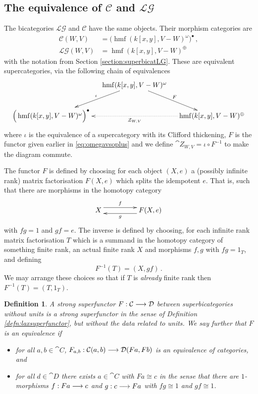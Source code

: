 \documentclass[english,letter paper,12pt,leqno]{article}
\theoremstyle{example}
\newtheorem{definition}[theorem]{Definition}
\numberwithin{equation}{section}
\def\LG{\mathcal{LG}}
\def\be{\begin{equation}}
\def\ee{\end{equation}}
\def\L{\mathcal{C}}
\DeclareMathOperator{\hmf}{hmf}
\begin{document}
\subsection{The equivalence of $\L$ and $\LG$}\label{section:equivalenceforreal}

The bicategories $\LG$ and $\L$ have the same objects. Their morphism categories are 
\begin{align*}
\L(W,V) &= \Big( \hmf( k[x,y], V - W )^{\omega} \Big)^{\bullet}\,,\\
\LG(W,V) &= \hmf( k[x,y], V - W )^{\oplus}
\end{align*}
with the notation from Section \ref{section:superbicatLG}. These are equivalent supercategories, via the following chain of equivalences
\be
\xymatrix@C-1pc{
& \ar[dl]_-{\iota}\hmf( k[x,y], V - W )^{\omega}\ar[dr]^-{F}\\
\Big( \hmf( k[x,y], V - W )^{\omega} \Big)^{\bullet} &  & \hmf( k[x,y], V - W )^{\oplus}\ar@{.>}[ll]^-{\cat{Z}_{W,V}}
}
\ee
where $\iota$ is the equivalence of a supercategory with its Clifford thickening, $F$ is the functor given earlier in \eqref{eq:omegavsoplus} and we define $\cat{Z}_{W,V} = \iota \circ F^{-1}$ to make the diagram commute. 

The functor $F$ is defined by choosing for each object $(X,e)$ a (possibly infinite rank) matrix factorisation $F(X,e)$ which splits the idempotent $e$. That is, such that there are morphisms in the homotopy category
\[
\xymatrix@C+2pc{
X \ar@<1ex>[r]^-{f} & F(X,e) \ar@<1ex>[l]^-{g}
}
\]
with $f g = 1$ and $gf = e$. The inverse is defined by choosing, for each infinite rank matrix factorisation $T$ which is a summand in the homotopy category of something finite rank, an actual finite rank $X$ and morphisms $f,g$ with $fg = 1_T$, and defining
\[
F^{-1}(T) = (X,gf)\,.
\]
We may arrange these choices so that if $T$ is \emph{already} finite rank then $F^{-1}(T) = (T, 1_T)$.

\begin{definition} A \emph{strong superfunctor} $F: \mathcal{C} \longrightarrow \mathcal{D}$ between superbicategories without units is a strong superfunctor in the sense of Definition \ref{defn:laxsuperfunctor}, but without the data related to units. We say further that $F$ is an \emph{equivalence} if 
\begin{itemize}
\item for all $a,b \in \cat{C}$, $F_{a,b}: \mathcal{C}(a,b) \longrightarrow \mathcal{D}(Fa, Fb)$ is an equivalence of categories, and
\item for all $d \in \cat{D}$ there exists $a \in \cat{C}$ with $Fa \cong c$ in the sense that there are $1$-morphisms $f: Fa \longrightarrow c$ and $g: c \longrightarrow Fa$ with $fg \cong 1$ and $gf \cong 1$.
\end{itemize}
\end{definition}
\end{document}
